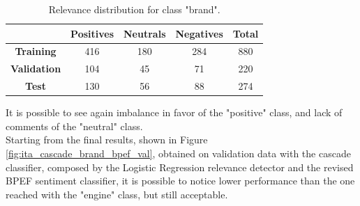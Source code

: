 \begin{table}[H]
	\centering
	\begin{tabular}{ | c  c  c c | c | } 
		\hline
		& \textbf{Positives} & \textbf{Neutrals} & \textbf{Negatives} & \textbf{Total} \\
		\hline
		\textbf{Training} & 416 & 180 & 284 & 880 \\ 
		\hline
		\textbf{Validation} & 104 & 45 & 71 & 220 \\ 
		\hline
		\textbf{Test} & 130 & 56 & 88 & 274 \\
		\hline
	\end{tabular}
	\caption{Relevance distribution for class "brand".}
	\label{table:snt-dist-brand}
\end{table}

It is possible to see again imbalance in favor of the "positive" class, and lack of comments of the "neutral" class.\\
Starting from the final results, shown in Figure \ref{fig:ita_cascade_brand_bpef_val}, obtained on validation data with the cascade classifier, composed by the Logistic Regression relevance detector and the revised BPEF sentiment classifier, it is possible to notice lower performance than the one reached with the "engine" class, but still acceptable.


